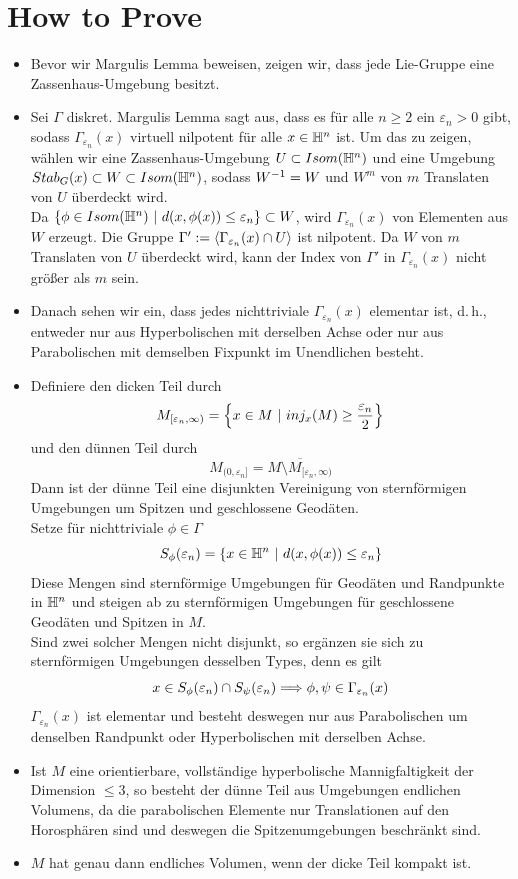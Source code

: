 \documentclass{book}
\renewcommand{\epsilon}{\varepsilon}
\newcommand{\thick}{M_{[\epsilon_n, \infty)}}
\newcommand{\thin}{M_{(0,\epsilon_n]}}
\begin{document}
\section{How to Prove}
\begin{itemize}
	\item Bevor wir Margulis Lemma beweisen, zeigen wir, dass jede Lie-Gruppe eine Zassenhaus-Umgebung besitzt.
	\item Sei $\Gamma$ diskret. Margulis Lemma sagt aus, dass es für alle $n\geq 2$ ein $\epsilon_n>0$ gibt, sodass $\Gamma_{\epsilon_n}(x)$ virtuell nilpotent für alle $x\in \mathbb{H}^n$ ist. Um das zu zeigen, wählen wir eine Zassenhaus-Umgebung $U\subset Isom(\mathbb{H}^n)$ und eine Umgebung $Stab_G(x) \subset W \subset Isom(\mathbb{H}^n)$, sodass $W^{-1} = W$ und $W^m$ von $m$ Translaten von $U$ überdeckt wird.\\
	Da $\set{\phi \in Isom(\H^n)}{d(x,\phi(x)) \leq \epsilon_n}\subset W$, wird $\Gamma_{\epsilon_n}(x)$ von Elementen aus $W$ erzeugt. Die Gruppe $\Gamma' := \shrp{\Gamma_{\epsilon_n}(x)\cap U}$ ist nilpotent.
	Da $W$ von $m$ Translaten von $U$ überdeckt wird, kann der Index von $\Gamma'$ in $\Gamma_{\epsilon_n}(x)$ nicht größer als $m$ sein.
	\item Danach sehen wir ein, dass jedes nichttriviale $\Gamma_{\epsilon_n}(x)$ elementar ist, d.\,h., entweder nur aus Hyperbolischen mit derselben Achse oder nur aus Parabolischen mit demselben Fixpunkt im Unendlichen besteht.
	\item Definiere den dicken Teil durch
	\[ \thick = \set{x \in M}{inj_x(M) \geq \frac{\epsilon_n}{2}} \]
	und den dünnen Teil durch
	\[ \thin = \overline{M\setminus \thick} \]
	Dann ist der dünne Teil eine disjunkten Vereinigung von sternförmigen Umgebungen um Spitzen und geschlossene Geodäten.\\
	Setze für nichttriviale $\phi \in \Gamma$
	\[ S_\phi(\epsilon_n) = \set{x\in \H^n}{d(x,\phi(x)) \leq \epsilon_n} \]
	Diese Mengen sind sternförmige Umgebungen für Geodäten und Randpunkte in $\mathbb{H}^n$ und steigen ab zu sternförmigen Umgebungen für geschlossene Geodäten und Spitzen in $M$.\\
	Sind zwei solcher Mengen nicht disjunkt, so ergänzen sie sich zu sternförmigen Umgebungen desselben Types, denn es gilt
	\[ x \in S_\phi(\epsilon_n) \cap S_\psi(\epsilon_n) \Impl{} \phi, \psi \in \Gamma_{\epsilon_n}(x) \]
	$\Gamma_{\epsilon_n}(x)$ ist elementar und besteht deswegen nur aus Parabolischen um denselben Randpunkt oder Hyperbolischen mit derselben Achse.
	\item Ist $M$ eine orientierbare, vollständige hyperbolische Mannigfaltigkeit der Dimension $\leq 3$, so besteht der dünne Teil aus Umgebungen endlichen Volumens, da die parabolischen Elemente nur Translationen auf den Horosphären sind und deswegen die Spitzenumgebungen beschränkt sind.
	\item $M$ hat genau dann endliches Volumen, wenn der dicke Teil kompakt ist.
\end{itemize}
\end{document}
